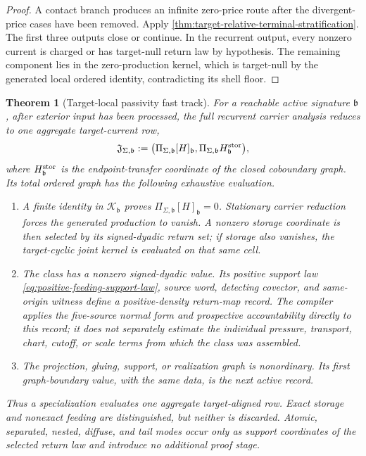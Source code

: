\documentclass[11pt]{article}
\numberwithin{section}{part}
\theoremstyle{plain}
\newtheorem{theorem}{Theorem}[section]
\theoremstyle{definition}
\theoremstyle{remark}
\begin{document}
\begin{proof}
A contact branch produces an infinite zero-price route after the divergent-
price cases have been removed.  Apply
\cref{thm:target-relative-terminal-stratification}.  The first three outputs
close or continue.  In the recurrent output, every nonzero current is charged
or has target-null return law by hypothesis.  The remaining component lies in
the zero-production kernel, which is target-null by the generated local
ordered identity, contradicting its shell floor.
\end{proof}

\begin{theorem}[Target-local passivity fast track]
\label{thm:target-local-passivity-fast-track}
For a reachable active signature \(\mathfrak b\), after exterior input has
been processed, the full recurrent carrier analysis reduces to one aggregate
target-current row,
\begin{equation}
 \label{eq:passivity-fast-track-class}
 \mathfrak J_{\Sigma,\mathfrak b}
 :=\bigl(\Pi_{\Sigma,\mathfrak b}[H]_{\mathfrak b},
         \Pi_{\Sigma,\mathfrak b}H^{\rm stor}_{\mathfrak b}\bigr),
\end{equation}
where \(H^{\rm stor}_{\mathfrak b}\) is the endpoint-transfer coordinate of
the closed coboundary graph.  Its total ordered graph has the following
exhaustive evaluation.
\begin{enumerate}[label=\textup{(F\arabic*)}]
\item A finite identity in \(\mathcal K_{\mathfrak b}\) proves
\(\Pi_{\Sigma,\mathfrak b}[H]_{\mathfrak b}=0\).  Stationary carrier
reduction forces the generated production to vanish.  A nonzero storage
coordinate is then selected by its signed-dyadic return set; if storage also
vanishes, the target-cyclic joint kernel is evaluated on that same cell.
\item The class has a nonzero signed-dyadic value.  Its positive support law
\eqref{eq:positive-feeding-support-law}, source word, detecting covector, and
same-origin witness define a positive-density return-map record.  The compiler applies the
five-source normal form and prospective accountability directly to this
record; it does not separately estimate the individual pressure, transport,
chart, cutoff, or scale terms from which the class was assembled.
\item The projection, gluing, support, or realization graph is nonordinary.
Its first graph-boundary value, with the same data, is the next active record.
\end{enumerate}
Thus a specialization evaluates one aggregate target-aligned row.  Exact
storage and nonexact feeding are distinguished, but neither is discarded.
Atomic, separated, nested, diffuse, and tail modes occur only as support
coordinates of the selected return law and introduce no additional proof
stage.
\end{theorem}
\end{document}
